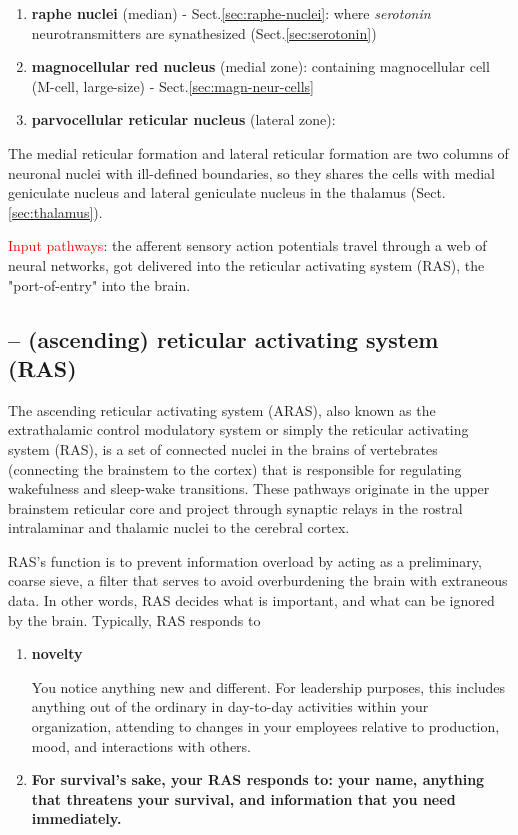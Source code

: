 \begin{enumerate}
  \item  {\bf raphe nuclei} (median) - Sect.\ref{sec:raphe-nuclei}: where {\it
  serotonin} neurotransmitters are synathesized (Sect.\ref{sec:serotonin})
  
  \item {\bf magnocellular red nucleus} (medial zone): containing magnocellular
  cell (M-cell, large-size)  - Sect.\ref{sec:magn-neur-cells}
  
  
  \item {\bf parvocellular reticular nucleus} (lateral zone): 
  
\end{enumerate}
The medial reticular formation and lateral reticular formation are two columns
of neuronal nuclei with ill-defined boundaries, so they shares the cells with
medial geniculate nucleus and lateral geniculate nucleus in the thalamus
(Sect.\ref{sec:thalamus}).

\textcolor{red}{Input pathways}:
the afferent sensory action potentials travel through a web of neural networks,
got delivered into 
the reticular activating system (RAS), the "port-of-entry" into the brain.

\subsection{-- (ascending) reticular activating system (RAS)}
\label{sec:reticular-activating-system}

The ascending reticular activating system (ARAS), also known as the
extrathalamic control modulatory system or simply the reticular activating
system (RAS), is a set of connected nuclei in the brains of vertebrates
(connecting the brainstem to the cortex) that is responsible for regulating
wakefulness and sleep-wake transitions.  These pathways originate in the upper
brainstem reticular core and project through synaptic relays in the rostral
intralaminar and thalamic nuclei to the cerebral cortex. 

RAS's function is to prevent information overload by acting as a preliminary,
coarse sieve, a filter that serves to avoid overburdening the brain with
extraneous data. In other words, RAS decides what is important, and what can be
ignored by the brain. Typically, RAS responds to
\begin{enumerate}
  \item {\bf novelty}
  
You notice anything    new and different. For leadership purposes, this includes
anything out of the ordinary in day-to-day activities within your organization,
attending to changes in your employees relative to production, mood, and
interactions with others.

  \item {\bf For survival's sake, your RAS responds to:    your name, anything
  that threatens your survival,    and information that you need immediately.}
  
\end{enumerate}

